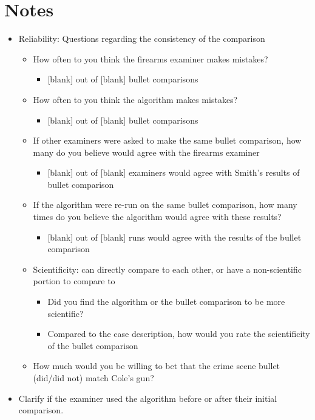 \documentclass[print]{nuthesis}
\providecommand{\tightlist}{%
  \setlength{\itemsep}{0pt}\setlength{\parskip}{0pt}}
\begin{document}
\hypertarget{notes-1}{%
\section{Notes}\label{notes-1}}

\begin{itemize}
\tightlist
\item
  Reliability: Questions regarding the consistency of the comparison

  \begin{itemize}
  \tightlist
  \item
    How often to you think the firearms examiner makes mistakes?

    \begin{itemize}
    \tightlist
    \item
      {[}blank{]} out of {[}blank{]} bullet comparisons
    \end{itemize}
  \item
    How often to you think the algorithm makes mistakes?

    \begin{itemize}
    \tightlist
    \item
      {[}blank{]} out of {[}blank{]} bullet comparisons
    \end{itemize}
  \item
    If other examiners were asked to make the same bullet comparison, how many do you believe would agree with the firearms examiner

    \begin{itemize}
    \tightlist
    \item
      {[}blank{]} out of {[}blank{]} examiners would agree with Smith's results of bullet comparison
    \end{itemize}
  \item
    If the algorithm were re-run on the same bullet comparison, how many times do you believe the algorithm would agree with these results?

    \begin{itemize}
    \tightlist
    \item
      {[}blank{]} out of {[}blank{]} runs would agree with the results of the bullet comparison
    \end{itemize}
  \item
    Scientificity: can directly compare to each other, or have a non-scientific portion to compare to

    \begin{itemize}
    \tightlist
    \item
      Did you find the algorithm or the bullet comparison to be more scientific?
    \item
      Compared to the case description, how would you rate the scientificity of the bullet comparison
    \end{itemize}
  \item
    How much would you be willing to bet that the crime scene bullet (did/did not) match Cole's gun?
  \end{itemize}
\item
  Clarify if the examiner used the algorithm before or after their initial comparison.
\end{itemize}
\end{document}
